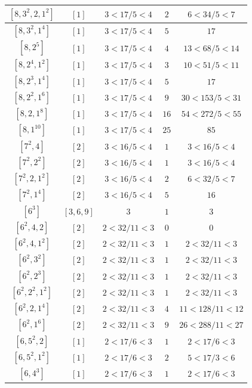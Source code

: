 \documentclass{article}%
\begin{document}
\begin{center}
\begin{longtable}{||c|c|c|c|c||}
$[8, 3^{2}, 2, 1^{2}]$ & $[1]$ & $3 < 17/5 < 4$ & $2$ & $6 < 34/5 < 7$ \\ \hline 
$[8, 3^{2}, 1^{4}]$ & $[1]$ & $3 < 17/5 < 4$ & $5$ & $17$ \\ \hline 
$[8, 2^{5}]$ & $[1]$ & $3 < 17/5 < 4$ & $4$ & $13 < 68/5 < 14$ \\ \hline 
$[8, 2^{4}, 1^{2}]$ & $[1]$ & $3 < 17/5 < 4$ & $3$ & $10 < 51/5 < 11$ \\ \hline 
$[8, 2^{3}, 1^{4}]$ & $[1]$ & $3 < 17/5 < 4$ & $5$ & $17$ \\ \hline 
$[8, 2^{2}, 1^{6}]$ & $[1]$ & $3 < 17/5 < 4$ & $9$ & $30 < 153/5 < 31$ \\ \hline 
$[8, 2, 1^{8}]$ & $[1]$ & $3 < 17/5 < 4$ & $16$ & $54 < 272/5 < 55$ \\ \hline 
$[8, 1^{10}]$ & $[1]$ & $3 < 17/5 < 4$ & $25$ & $85$ \\ \hline 
$[7^{2}, 4]$ & $[2]$ & $3 < 16/5 < 4$ & $1$ & $3 < 16/5 < 4$ \\ \hline 
$[7^{2}, 2^{2}]$ & $[2]$ & $3 < 16/5 < 4$ & $1$ & $3 < 16/5 < 4$ \\ \hline 
$[7^{2}, 2, 1^{2}]$ & $[2]$ & $3 < 16/5 < 4$ & $2$ & $6 < 32/5 < 7$ \\ \hline 
$[7^{2}, 1^{4}]$ & $[2]$ & $3 < 16/5 < 4$ & $5$ & $16$ \\ \hline 
$[6^{3}]$ & $[3, 6, 9]$ & $3$ & $1$ & $3$ \\ \hline 
$[6^{2}, 4, 2]$ & $[2]$ & $2 < 32/11 < 3$ & $0$ & $0$ \\ \hline 
$[6^{2}, 4, 1^{2}]$ & $[2]$ & $2 < 32/11 < 3$ & $1$ & $2 < 32/11 < 3$ \\ \hline 
$[6^{2}, 3^{2}]$ & $[2]$ & $2 < 32/11 < 3$ & $1$ & $2 < 32/11 < 3$ \\ \hline 
$[6^{2}, 2^{3}]$ & $[2]$ & $2 < 32/11 < 3$ & $1$ & $2 < 32/11 < 3$ \\ \hline 
$[6^{2}, 2^{2}, 1^{2}]$ & $[2]$ & $2 < 32/11 < 3$ & $1$ & $2 < 32/11 < 3$ \\ \hline 
$[6^{2}, 2, 1^{4}]$ & $[2]$ & $2 < 32/11 < 3$ & $4$ & $11 < 128/11 < 12$ \\ \hline 
$[6^{2}, 1^{6}]$ & $[2]$ & $2 < 32/11 < 3$ & $9$ & $26 < 288/11 < 27$ \\ \hline 
$[6, 5^{2}, 2]$ & $[1]$ & $2 < 17/6 < 3$ & $1$ & $2 < 17/6 < 3$ \\ \hline 
$[6, 5^{2}, 1^{2}]$ & $[1]$ & $2 < 17/6 < 3$ & $2$ & $5 < 17/3 < 6$ \\ \hline 
$[6, 4^{3}]$ & $[1]$ & $2 < 17/6 < 3$ & $1$ & $2 < 17/6 < 3$ \\ \hline 

\end{longtable}
\end{center}
\end{document}
